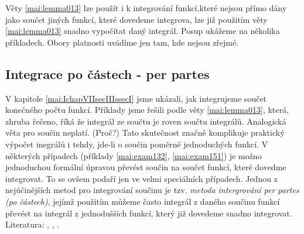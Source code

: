       Věty \ref{mai:lemma013} lze použít i k integrování funkcí,které nejsou přímo dány jako součet
      jiných funkcí, které dovedeme integrova, lze již použitím věty \ref{mai:lemma013} snadno
      vypočítat daný integrál. Posup ukážeme na několika příkladech. Obory platnosti uvádíme jen
      tam, kde nejsou zřejmé. 
    \newpage
    \subsection{Integrace po částech - per partes}\label{mai:IchapVIIsecIIIssecII} 
      V kapitole \ref{mai:IchapVIIsecIIIssecI} jsme ukázali, jak integrujeme součet konečného počtu
      funkcí. Příklady jsme řešili podle věty \ref{mai:lemma013}, která, zhruba řečeno, říká že
      integrál ze součtu je roven součtu integrálů. Analogická věta pro součin neplatí. (Proč?) Tato
      skutečnost značně komplikuje praktický výpočet inegrálů i tehdy, jde-li o součin poměrně
      jednoduchých funkcí. V některých případech (příklady \ref{mai:exam132}, \ref{mai:exam151}) je
      možno jednoduchou formální úpravou převést součin na součet funkcí, které dovedme integrovat.
      To se ovšem podaří jen ve velmi speciálních případech. Jednou z nejúčinějších metod pro
      integrování součinu je tzv. \emph{metoda intergrování per partes (po částech)}, jejímž
      použitím můžeme často integrál z daného součinu funkcí převést na integrál z jednodušších
      funkcí, který již dovedeme snadno integrovat. Literatura: \cite[p.~137]{Musilova2009MA1},
      \cite[s.~33]{Knichal}, \cite[s.~20]{Hoskova}.
      
